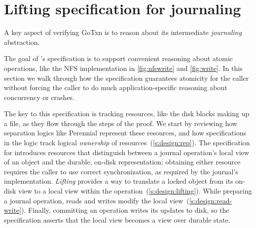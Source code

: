 \section{Lifting specification for journaling}%
\label{sec:txn:lifting}




A key aspect of verifying GoTxn is to reason about its intermediate
\emph{journaling} abstraction.



The goal of \txn's specification is to support convenient reasoning about atomic
operations, like the NFS  implementation in \cref{fig:nfswrite} and \cref{fig:write}.
In this section we walk through how the specification
guarantees atomicity for the caller without forcing the caller to do
much application-specific reasoning about concurrency or
crashes.

The key to this specification is tracking resources, like the disk blocks making up a
file, as they flow through the steps of the proof. We start by reviewing how
separation logics like Perennial represent these resources, and how
specifications in the logic track logical \emph{ownership} of
resources~(\cref{s:design:rep}). The specification for \txn introduces
resources that distinguish between a journal operation's local view of an object and
the durable, on-disk representation; obtaining either resource
requires the caller to use correct synchronization, as required by the journal's
implementation. \emph{Lifting} provides a
way to translate
a locked object from its on-disk view to a local view within the operation~(\cref{s:design:lifting}).
While preparing a journal operation, reads and writes modify the local
view~(\cref{s:design:read-write}). Finally, committing an operation writes
its updates to disk, so the specification asserts that the local
view becomes a view over durable state.

